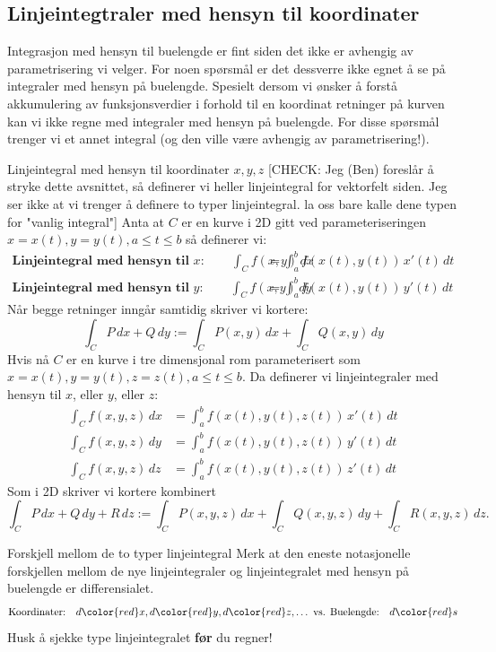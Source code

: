 \subsection{Linjeintegtraler med hensyn til koordinater}

Integrasjon med hensyn til buelengde er fint siden det ikke er avhengig av parametrisering vi velger. For noen spørsmål er det dessverre ikke egnet å se på integraler med hensyn på buelengde. Spesielt dersom vi ønsker å forstå akkumulering av funksjonsverdier i forhold til en koordinat retninger på kurven kan vi ikke regne med integraler med hensyn på buelengde. For disse spørsmål trenger vi et annet integral (og den ville være avhengig av parametrisering!). 

\begin{defn}{Linjeintegral med hensyn til koordinater $x, y, z$}
[CHECK: Jeg (Ben) foreslår å stryke dette avsnittet, så definerer vi heller linjeintegral for vektorfelt siden. Jeg ser ikke at vi trenger å definere to typer linjeintegral. la oss bare kalle dene typen for "vanlig integral"]
Anta at \( C \) er en kurve i 2D gitt ved parameteriseringen $ x = x(t), y = y(t), a \leq t \leq b$ så definerer vi:
\begin{align*}
\textbf{Linjeintegral med hensyn til }x: \qquad\int_C f(x, y)\, dx &= \int_a^b f(x(t), y(t))\, x'(t)\, dt
\\
\textbf{Linjeintegral med hensyn til }y: \qquad\int_C f(x, y)\, dy &= \int_a^b f(x(t), y(t))\, y'(t)\, dt
\end{align*}
Når begge retninger inngår samtidig skriver vi kortere:
\[
\int_C P\, dx + Q\, dy := \int_C P(x, y)\, dx + \int_C Q(x, y)\, dy
\]
Hvis nå \( C \) er en kurve i tre dimensjonal rom parameterisert som $x = x(t), y = y(t), z = z(t), a \leq t \leq b$. Da definerer vi linjeintegraler med hensyn til $x$, eller $y$, eller $z$:
\begin{align*}
\int_C f(x, y, z)\, dx &= \int_a^b f(x(t), y(t), z(t))\, x'(t)\, dt
\\
\int_C f(x, y, z)\, dy &= \int_a^b f(x(t), y(t), z(t))\, y'(t)\, dt
\\
\int_C f(x, y, z)\, dz &= \int_a^b f(x(t), y(t), z(t))\, z'(t)\, dt
\end{align*}
Som i 2D skriver vi kortere kombinert 
\[\int_C P\, dx + Q\, dy + R\, dz:=\int_C P(x,y,z)\, dx + \int_C Q(x,y,z)\, dy + \int_C R(x,y,z)\, dz.\]
\label{defn:linjeint_koord}
\end{defn}
\begin{rem}{Forskjell mellom de to typer linjeintegral}
Merk at den eneste notasjonelle forskjellen mellom de nye linjeintegraler og linjeintegralet med hensyn på buelengde er differensialet. 
\[\text{Koordinater:}\quad d{\color{red} x}, d{\color{red} y} , d{\color{red} z} ,\ldots \text{ vs. Buelengde:} \quad d{\color{red} s} \]
Husk å sjekke type linjeintegralet \textbf{før} du regner!
\end{rem}


